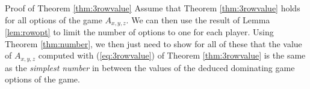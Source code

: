 \begin{proof2}{Proof of Theorem \ref{thm:3rowvalue}}
Assume that Theorem \ref{thm:3rowvalue} holds for all options of the game $A_{x,y,z}$. We can then use the result of Lemma \ref{lem:rowopt} to limit the number of options to one for each player. 
Using Theorem \ref{thm:number}, we then just need to show for all of these that the value of $A_{x,y,z}$ computed with (\ref{eq:3rowvalue}) of Theorem \ref{thm:3rowvalue} is the same as the \emph{simplest number} in between the values of the deduced dominating game options of the game.

\end{proof2}
